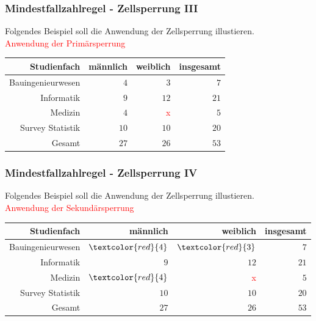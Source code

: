 \documentclass[aspectratio=169]{beamer}
\begin{document}
\begin{frame}
    \frametitle{Mindestfallzahlregel - Zellsperrung III}
    Folgendes Beispiel soll die Anwendung der Zellsperrung illustieren. \\
    \textcolor{red}{Anwendung der Primärsperrung}
    \begin{center}
        \begin{tabular}{ r r r r }
         \textbf{Studienfach} \vline & \textbf{männlich} & \textbf{weiblich} & \textbf{insgesamt} \\ 
         \hline
         Bauingenieurwesen \vline & $4$ & $3$ & $7$ \\
         Informatik \vline & $9$ & $12$ & $21$ \\  
         Medizin \vline & $4$ & \textcolor{red}{x} & $5$ \\
         Survey Statistik \vline & $10$ & $10$ & $20$ \\
         \hline
         Gesamt \vline & $27$ & $26$ & $53$
        \end{tabular}
    \end{center}
\end{frame}


\begin{frame}
    \frametitle{Mindestfallzahlregel - Zellsperrung IV}
    Folgendes Beispiel soll die Anwendung der Zellsperrung illustieren. \\
    \textcolor{red}{Anwendung der Sekundärsperrung}
    \begin{center}
        \begin{tabular}{ r r r r }
         \textbf{Studienfach} \vline & \textbf{männlich} & \textbf{weiblich} & \textbf{insgesamt} \\ 
         \hline
         Bauingenieurwesen \vline & $\textcolor{red}{4}$ & $\textcolor{red}{3}$ & $7$ \\
         Informatik \vline & $9$ & $12$ & $21$ \\  
         Medizin \vline & $\textcolor{red}{4}$ & \textcolor{red}{x} & $5$ \\
         Survey Statistik \vline & $10$ & $10$ & $20$ \\
         \hline
         Gesamt \vline & $27$ & $26$ & $53$
        \end{tabular}
    \end{center}
\end{frame}
\end{document}
